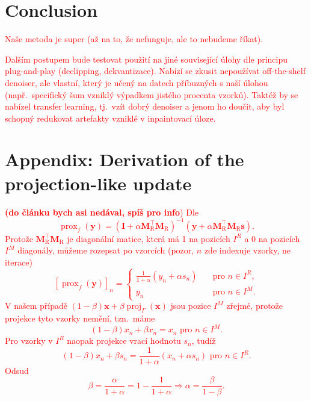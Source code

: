 \documentclass[conference]{IEEEtran}
\newcommand{\todo}[1]{\textcolor{red}{#1}}
\begin{document}
\section{Conclusion}
\label{sec:conclusion}

\todo{Naše metoda je super (až na to, že nefunguje, ale to nebudeme říkat).}

\todo{Dalším postupem bude testovat použití na jiné související úlohy dle principu plug-and-play (declipping, dekvantizace). Nabízí se zkusit nepoužívat off-the-shelf denoiser, ale vlastní, který je učený na datech příbuzných s naší úlohou (např.\ specifický šum vzniklý výpadkem jistého procenta vzorků). Taktéž by se nabízel transfer learning, tj.\ vzít dobrý denoiser a jenom ho doučit, aby byl schopný redukovat artefakty vzniklé v inpaintovací úloze.}

\section*{Appendix: Derivation of the projection-like update}

\noindent
\todo{\textbf{(do článku bych asi nedával, spíš pro info})}
\todo{%
	Dle \cite[Tab.\,1]{Combettes2011}
	\begin{equation}
		\operatorname{prox}_f(\mathbf{y}) = (\mathbf{I} + \alpha \mathbf{M}_{\mathrm{R}}^\top\mathbf{M}_{\mathrm{R}})^{-1}(\mathbf{y} + \alpha\mathbf{M}_{\mathrm{R}}^\top\mathbf{M}_{\mathrm{R}}\mathbf{s}).
	\end{equation}
	Protože $\mathbf{M}_{\mathrm{R}}^\top\mathbf{M}_{\mathrm{R}}$ je diagonální matice, která má 1 na pozicích $I^R$ a 0 na pozicích $I^M$ diagonály, můžeme rozepsat po vzorcích (pozor, $n$ zde indexuje vzorky, ne iterace)
	\begin{equation}
		\left[\operatorname{prox}_f(\mathbf{y})\right]_n = \begin{cases}
			\frac{1}{1+\alpha}(y_n + \alpha s_n) \quad &\text{pro } n\in I^R, \\
			y_n\quad &\text{pro } n\in I^M. 
		\end{cases}
	\end{equation}
	V našem případě $(1-\beta)\mathbf{x} + \beta \operatorname{proj}_{\Gamma}(\mathbf{x})$ jsou pozice $I^M$ zřejmé, protože projekce tyto vzorky nemění, tzn.\ máme
	\begin{equation}
		(1-\beta) x_n + \beta x_n = x_n \text{ pro } n\in I^M.
	\end{equation}
	Pro vzorky v $I^R$ naopak projekce vrací hodnotu $s_n$, tudíž
	\begin{equation}
		(1-\beta) x_n + \beta s_n = \frac{1}{1+\alpha}(x_n + \alpha s_n)\text{ pro } n\in I^R.
	\end{equation}
	Odsud
	\begin{equation}
		\beta = \frac{\alpha}{1+\alpha} = 1 - \frac{1}{1+\alpha} \Longrightarrow \alpha = \frac{\beta}{1-\beta}.
	\end{equation}
}
\end{document}
